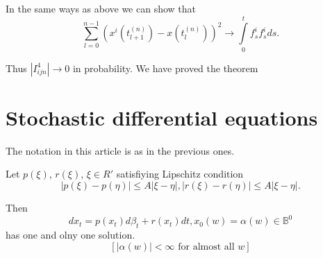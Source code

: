 \begin{pot*}
In the same ways as above we can show that 
$$
\sum^{ n - 1}_{ l = 0} \left(x^i (t^{(n)}_{ l +1}) - x (t_l ^{(n)})\right)^2
\to \int\limits^t_0 f^i_s f^i_s ds.  
$$
  
  Thus $|I^4 _{ ijn}| \to 0 $ in probability. We have proved the theorem 
\end{pot*} 

\section{Stochastic differential equations}\label{chap5-sec6}%

The notation in this article is as in the previous ones. 
\setcounter{thm}{0}
\begin{thm}\label{chap5-sec6-thm1}%
Let $p(\xi)$, $r (\xi)$, $\xi\in R'$ satisfiying Lipschitz condition 
$$
| p (\xi) - p (\eta)| \leq A | \xi - \eta |, |r(\xi) - r (\eta) |
  \leq A | \xi - \eta |.  
$$\pageoriginale
  
Then 
$$
dx_t = p(x_t) d \beta_t + r(x_t) dt, x_0 (w) = \alpha (w) \in \mathbb{B}^0 
$$
has one and olny one solution. 
$$
[ | \alpha (w) | < \infty \text{ for almost all } w ]
$$
\end{thm}

